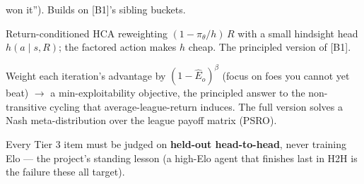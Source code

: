 \documentclass[11pt]{article}
\newcommand{\pol}{\pi_\theta}
\begin{document}
\begin{description}[leftmargin=0pt,itemsep=2pt]
won it''). Builds on [B1]'s sibling buckets.
\item[\textnormal{\textbf{[B4] Hindsight credit assignment.}}] Return-conditioned HCA reweighting
$(1-\pol/h)\,R$ with a small hindsight head $h(a\mid s,R)$; the factored action makes $h$ cheap. The
principled version of [B1].
\item[\textnormal{\textbf{[E5] Worst-case / PSRO weighting.}}] Weight each iteration's advantage by
$(1-\hat E_o)^\beta$ (focus on foes you cannot yet beat) $\to$ a min-exploitability objective, the
principled answer to the non-transitive cycling that average-league-return induces. The full version solves a
Nash meta-distribution over the league payoff matrix (PSRO).
\end{description}
\noindent Every Tier 3 item must be judged on \textbf{held-out head-to-head}, never training Elo --- the
project's standing lesson (a high-Elo agent that finishes last in H2H is the failure these all target).

\end{document}
